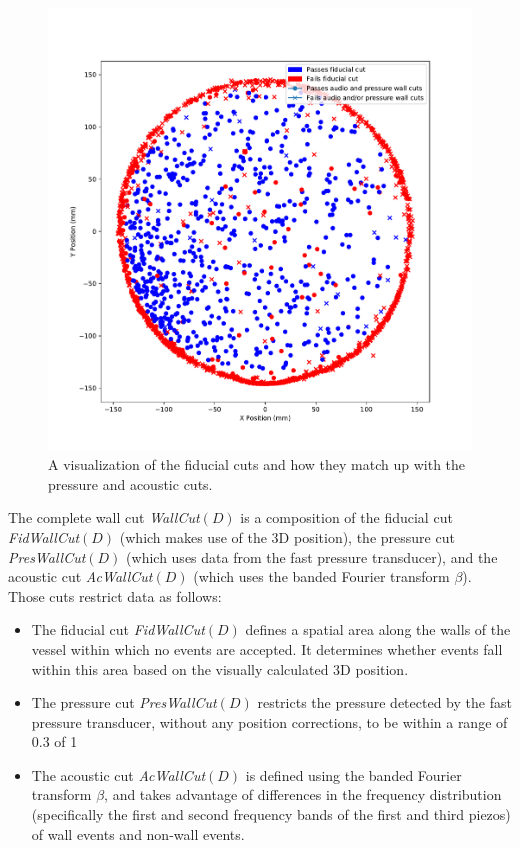 \documentclass[10pt]{article}
\begin{document}
\begin{figure}[!ht]
    \centering
    \includegraphics[width=\textwidth]{wall_event_positions}
    \caption{\label{wall_cuts_visualization} A visualization of the fiducial cuts and how they match up with the pressure and acoustic cuts.}
\end{figure}

The complete wall cut {\it WallCut}$(D)$ is a composition of the fiducial cut {\it FidWallCut}$(D)$ (which makes use of the 3D position), the pressure cut {\it PresWallCut}$(D)$ (which uses data from the fast pressure transducer), and the acoustic cut {\it AcWallCut}$(D)$ (which uses the banded Fourier transform $\beta$). Those cuts restrict data as follows:

\begin{itemize}
    \item The fiducial cut {\it FidWallCut}$(D)$ defines a spatial area along the walls of the vessel within which no events are accepted. It determines whether events fall within this area based on the visually calculated 3D position.
    \item The pressure cut {\it PresWallCut}$(D)$ restricts the pressure detected by the fast pressure transducer, without any position corrections, to be within a range of 0.3 of 1
    \item The acoustic cut {\it AcWallCut}$(D)$ is defined using the banded Fourier transform $\beta$, and takes advantage of differences in the frequency distribution (specifically the first and second frequency bands of the first and third piezos) of wall events and non-wall events.
\end{itemize}
\end{document}
